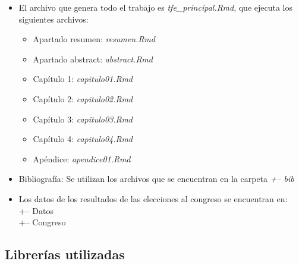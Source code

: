 \documentclass[12pt,a4paper,]{book}
\providecommand{\tightlist}{%
  \setlength{\itemsep}{0pt}\setlength{\parskip}{0pt}}
\numberwithin{dummy}{section}
\theoremstyle{ocrenumbox}
\theoremstyle{blacknumex}
\theoremstyle{blacknumbox}
\theoremstyle{ocrenum}
\theoremstyle{ocrenum}
\begin{document}
\begin{itemize}
\item
  El archivo que genera todo el trabajo es \emph{tfe\_principal.Rmd},
  que ejecuta los siguientes archivos:

  \begin{itemize}
  \tightlist
  \item
    Apartado resumen: \emph{resumen.Rmd}
  \item
    Apartado abstract: \emph{abstract.Rmd}
  \item
    Capítulo 1: \emph{capitulo01.Rmd}
  \item
    Capítulo 2: \emph{capitulo02.Rmd}
  \item
    Capítulo 3: \emph{capitulo03.Rmd}
  \item
    Capítulo 4: \emph{capitulo04.Rmd}
  \item
    Apéndice: \emph{apendice01.Rmd}
  \end{itemize}
\item
  Bibliografía: Se utilizan los archivos que se encuentran en la carpeta
  \emph{+-- bib}
\item
  Los datos de los resultados de las elecciones al congreso se
  encuentran en:\\
  +-- Datos\\
  \textbar{} +-- Congreso
\end{itemize}

\hypertarget{libreruxedas-utilizadas}{%
\subsection{Librerías utilizadas}\label{libreruxedas-utilizadas}}

\renewcommand{\arraystretch}{0.6}
\end{document}
